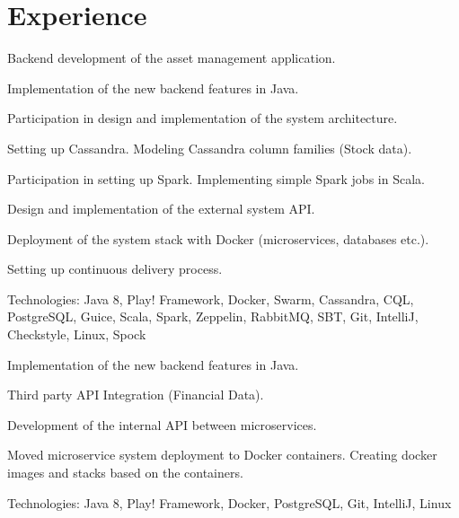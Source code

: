 \documentclass[]{deedy-resume-openfont}
\begin{document}
\begin{minipage}[t]{0.66\textwidth} 


\section{Experience}

\sectionsep

Backend development of the asset management application. %
\vspace{\topsep} %
\begin{tightemize}
\item Implementation of the new backend features in Java.
\item Participation in design and implementation of the system architecture. 
\item Setting up Cassandra. Modeling Cassandra column families (Stock data).
\item Participation in setting up Spark. Implementing simple Spark jobs in Scala. 
\item Design and implementation of the external system API.
\item Deployment of the system stack with Docker (microservices, databases etc.).
\item Setting up continuous delivery process.
\end{tightemize}
Technologies: Java 8, Play! Framework, Docker, Swarm, Cassandra, CQL, PostgreSQL, Guice, Scala, Spark, Zeppelin, RabbitMQ, SBT, Git, IntelliJ, Checkstyle, Linux, Spock
\sectionsep

\begin{tightemize}
\item Implementation of the new backend features in Java.
\item Third party API Integration (Financial Data).
\item Development of the internal API between microservices.
\item Moved microservice system deployment to Docker containers. Creating docker images and stacks based on the containers.
\end{tightemize}
Technologies: Java 8, Play! Framework, Docker, PostgreSQL, Git, IntelliJ, Linux
\sectionsep


\end{minipage}
\end{document}
